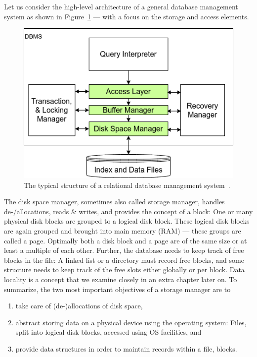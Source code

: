     Let us consider the high-level architecture of a general database management system as shown in Figure~\ref{dbms_arch} --- with a focus on the storage and access elements.

    \begin{figure}[htp]
    \begin{center}
    \includegraphics[keepaspectratio,width=.5\textwidth]{img/04-databases/RDBMS.png}
    \end{center}
    \caption{The typical structure of a relational database management system~\autocite{ramakrishnan2000database}.}
    \label{dbms_arch}
    \end{figure}

    The disk space manager, sometimes also called storage manager, handles de-/allocations, reads \& writes, and provides the concept of a block: One or many physical disk blocks are grouped to a logical disk block.
    These logical disk blocks are again grouped and brought into main memory (RAM) --- these groups are called a page.
    Optimally both a disk block and a page are of the same size or at least a multiple of each other. 
    Further, the database needs to keep track of free blocks in the file: 
    A linked list or a directory must record free blocks, and some structure needs to keep track of the free slots either globally or per block. 
    Data locality is a concept that we examine closely in an extra chapter later on.
    To summarize, the two most important objectives of a storage manager are to
    \begin{enumerate} 
     \item take care of (de-)allocations of disk space,
     \item abstract storing data on a physical device using the operating system: Files, split into logical disk blocks, accessed using OS facilities, and
     \item provide data structures in order to maintain records within a file, blocks.
    \end{enumerate}
    
